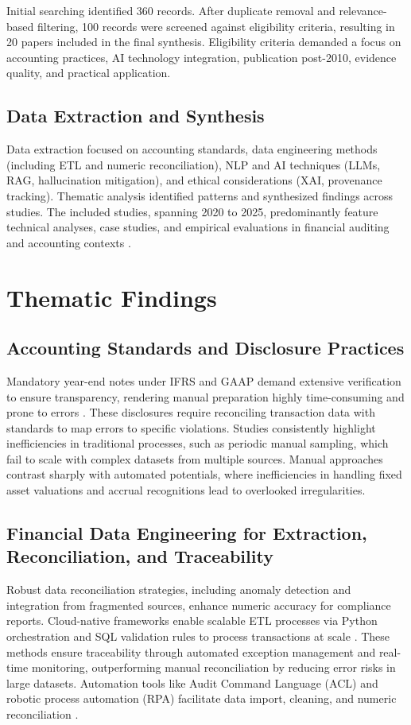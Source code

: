 Initial searching identified 360 records. After duplicate removal and relevance-based filtering, 100 records were screened against eligibility criteria, resulting in 20 papers included in the final synthesis. Eligibility criteria demanded a focus on accounting practices, AI technology integration, publication post-2010, evidence quality, and practical application.

\subsection{Data Extraction and Synthesis}
Data extraction focused on accounting standards, data engineering methods (including ETL and numeric reconciliation), NLP and AI techniques (LLMs, RAG, hallucination mitigation), and ethical considerations (XAI, provenance tracking). Thematic analysis identified patterns and synthesized findings across studies. The included studies, spanning 2020 to 2025, predominantly feature technical analyses, case studies, and empirical evaluations in financial auditing and accounting contexts \cite{Tripathi2025b, Nath2025b, Zhong2024}.

\section{Thematic Findings}

\subsection{Accounting Standards and Disclosure Practices}
Mandatory year-end notes under IFRS and GAAP demand extensive verification to ensure transparency, rendering manual preparation highly time-consuming and prone to errors \cite{Rushi2025a, Rushi2025b}. These disclosures require reconciling transaction data with standards to map errors to specific violations. Studies consistently highlight inefficiencies in traditional processes, such as periodic manual sampling, which fail to scale with complex datasets from multiple sources. Manual approaches contrast sharply with automated potentials, where inefficiencies in handling fixed asset valuations and accrual recognitions lead to overlooked irregularities.

\subsection{Financial Data Engineering for Extraction, Reconciliation, and Traceability}
Robust data reconciliation strategies, including anomaly detection and integration from fragmented sources, enhance numeric accuracy for compliance reports. Cloud-native frameworks enable scalable ETL processes via Python orchestration and SQL validation rules to process transactions at scale \cite{Tripathi2025b, Badugu2025}. These methods ensure traceability through automated exception management and real-time monitoring, outperforming manual reconciliation by reducing error risks in large datasets. Automation tools like Audit Command Language (ACL) and robotic process automation (RPA) facilitate data import, cleaning, and numeric reconciliation \cite{Rout2020a, Rout2020b}. 

